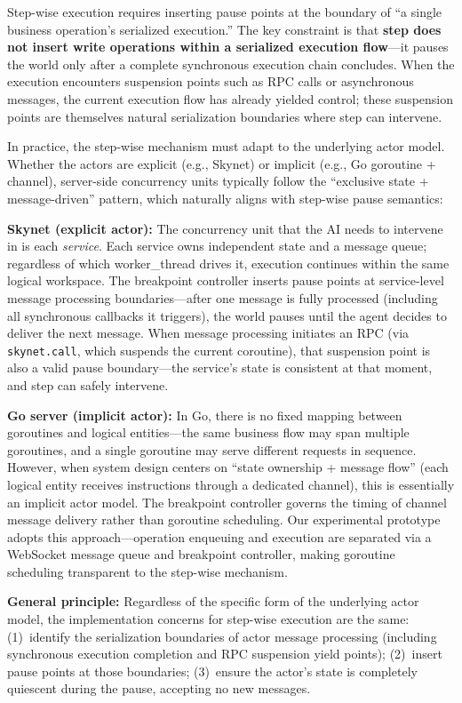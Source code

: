 \documentclass[sigconf,nonacm]{acmart}
\begin{document}
Step-wise execution requires inserting pause points at the boundary of ``a single business operation's serialized execution.'' The key constraint is that \textbf{step does not insert write operations within a serialized execution flow}---it pauses the world only after a complete synchronous execution chain concludes. When the execution encounters suspension points such as RPC calls or asynchronous messages, the current execution flow has already yielded control; these suspension points are themselves natural serialization boundaries where step can intervene.

In practice, the step-wise mechanism must adapt to the underlying actor model. Whether the actors are explicit (e.g., Skynet) or implicit (e.g., Go goroutine + channel), server-side concurrency units typically follow the ``exclusive state + message-driven'' pattern, which naturally aligns with step-wise pause semantics:

\textbf{Skynet (explicit actor):} The concurrency unit that the AI needs to intervene in is each \emph{service}. Each service owns independent state and a message queue; regardless of which worker\_thread drives it, execution continues within the same logical workspace. The breakpoint controller inserts pause points at service-level message processing boundaries---after one message is fully processed (including all synchronous callbacks it triggers), the world pauses until the agent decides to deliver the next message. When message processing initiates an RPC (via \texttt{skynet.call}, which suspends the current coroutine), that suspension point is also a valid pause boundary---the service's state is consistent at that moment, and step can safely intervene.

\textbf{Go server (implicit actor):} In Go, there is no fixed mapping between goroutines and logical entities---the same business flow may span multiple goroutines, and a single goroutine may serve different requests in sequence. However, when system design centers on ``state ownership + message flow'' (each logical entity receives instructions through a dedicated channel), this is essentially an implicit actor model. The breakpoint controller governs the timing of channel message delivery rather than goroutine scheduling. Our experimental prototype adopts this approach---operation enqueuing and execution are separated via a WebSocket message queue and breakpoint controller, making goroutine scheduling transparent to the step-wise mechanism.

\textbf{General principle:} Regardless of the specific form of the underlying actor model, the implementation concerns for step-wise execution are the same: (1)~identify the serialization boundaries of actor message processing (including synchronous execution completion and RPC suspension yield points); (2)~insert pause points at those boundaries; (3)~ensure the actor's state is completely quiescent during the pause, accepting no new messages.
\end{document}
